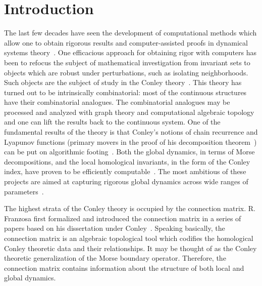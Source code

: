 



\section{Introduction}\label{sec:intro}


The last few decades have seen the development of computational methods which allow one to obtain rigorous results and computer-assisted proofs in dynamical systems theory~\cite{bl,mm,w}.   One efficacious approach for obtaining rigor with computers has been to refocus the subject of mathematical investigation from invariant sets to objects which are robust under perturbations, such as isolating neighborhoods.  Such objects are the subject of study in the Conley theory~\cite{conley}.  This theory has turned out to be intrinsically combinatorial: most of the continuous structures have their combinatorial analogues.  The combinatorial analogues may be processed and analyzed with graph theory and computational algebraic topology and one can lift the results back to the continuous system.  One of the fundamental results of the theory is that Conley's notions of chain recurrence and Lyapunov functions (primary movers in the proof of his decomposition theorem~\cite{conley}) can be put on algorithmic footing~\cite{bk,kmv}.  Both the global dynamics, in terms of Morse decompositions, and the local homological invariants, in the form of the Conley index, have proven to be efficiently computable~\cite{cmdb,cmdbchaos,kmm}.  The most ambitious of these projects are aimed at capturing rigorous global dynamics across wide ranges of parameters~\cite{cmdb,cmdbchaos,dsgrn}. 

The highest strata of the Conley theory is occupied by the connection matrix.  R. Franzosa first formalized and introduced the connection matrix in a series of papers based on his dissertation under Conley~\cite{fran,fran2,fran3}. Speaking basically, the connection matrix is an algebraic topological tool which codifies the homological Conley theoretic data and their relationships.  It may be thought of as the Conley theoretic generalization of the Morse boundary operator. Therefore, the connection matrix contains information about the structure of both local and global dynamics.  %


